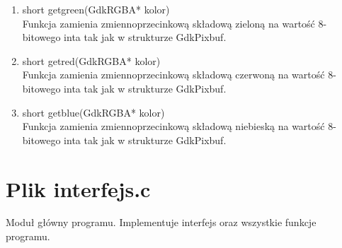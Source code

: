 \documentclass[a4paper]{article}
\begin{document}
\begin{enumerate}
	\item{short get\textunderscore green(GdkRGBA* kolor)}\\
	Funkcja zamienia zmiennoprzecinkową składową zieloną na wartość 8-bitowego inta tak jak w strukturze GdkPixbuf.
	
	\item{short get\textunderscore red(GdkRGBA* kolor)}\\
	Funkcja zamienia zmiennoprzecinkową składową czerwoną na wartość 8-bitowego inta tak jak w strukturze GdkPixbuf.
	
	\item{short get\textunderscore blue(GdkRGBA* kolor)}\\
	Funkcja zamienia zmiennoprzecinkową składową niebieską na wartość 8-bitowego inta tak jak w strukturze GdkPixbuf.

  \end{enumerate}
\section{Plik interfejs.c}

Moduł główny programu. Implementuje interfejs oraz wszystkie funkcje programu.
\end{document}
